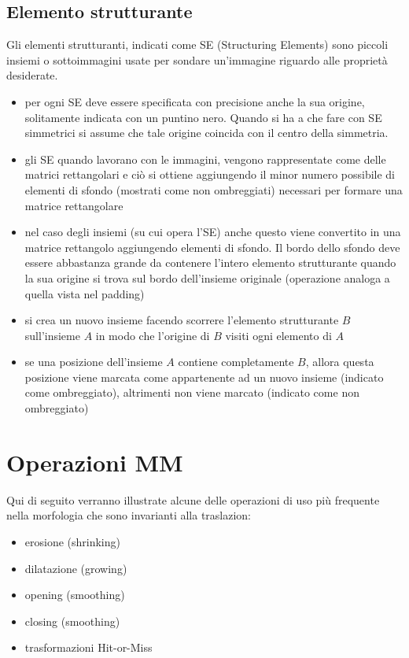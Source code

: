 \subsection{Elemento strutturante}
Gli elementi strutturanti, indicati come SE (Structuring Elements) sono piccoli insiemi o sottoimmagini usate per sondare un'immagine riguardo alle proprietà desiderate.
\begin{itemize}
	\item per ogni SE deve essere specificata con precisione anche la sua origine, solitamente indicata con un puntino nero. Quando si ha a che fare con SE simmetrici si assume che tale origine coincida con il centro della simmetria.
	
	\item gli SE quando lavorano con le immagini, vengono rappresentate come delle matrici rettangolari e ciò si ottiene aggiungendo il minor numero possibile di elementi di sfondo (mostrati come non ombreggiati) necessari per formare una matrice rettangolare
	
	\item nel caso degli insiemi (su cui opera l'SE) anche questo viene convertito in una matrice rettangolo aggiungendo elementi di sfondo. Il bordo dello sfondo deve essere abbastanza grande da contenere l'intero elemento strutturante quando la sua origine si trova sul bordo dell'insieme originale (operazione analoga a quella vista nel padding)
	
	\item si crea un nuovo insieme facendo scorrere l'elemento strutturante $B$ sull'insieme $A$ in modo che l'origine di $B$ visiti ogni elemento di $A$
	
	\item se una posizione dell'insieme $A$ contiene completamente $B$, allora questa posizione viene marcata come appartenente ad un nuovo insieme (indicato come ombreggiato), altrimenti non viene marcato (indicato come non ombreggiato)
\end{itemize}


\section{Operazioni MM}
Qui di seguito verranno illustrate alcune delle operazioni di uso più frequente nella morfologia che sono invarianti alla traslazion:
\begin{itemize}
	\item erosione (shrinking)
	\item dilatazione (growing)
	\item opening (smoothing)
	\item closing (smoothing)
	\item trasformazioni Hit-or-Miss
\end{itemize}

